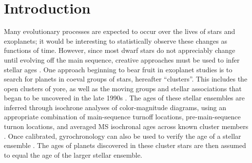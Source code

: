 \documentclass[12pt,twocolumn,tighten]{aastex62}
\begin{document}







\section{Introduction}
\label{sec:intro}

Many evolutionary processes are expected to occur over the lives of
stars and exoplanets; it would be interesting to statistically observe
these changes as functions of time.  However, since most dwarf stars
do not appreciably change until evolving off the
main sequence, creative approaches must be used to infer stellar ages
\citep{soderblom_ages_2010}.  One approach beginning to bear fruit in
exoplanet studies is to search for planets in coeval groups of stars,
hereafter ``clusters''.  This includes the open clusters of yore, as
well as the moving groups and stellar associations that began to be
uncovered in the late 1990s \citep{zuckerman_young_2004}.  The ages of
these stellar ensembles are inferred through isochrone analyses of
color-magnitude diagrams, using an appropriate combination of
main-sequence turnoff locations, pre-main-sequence turnon locations,
and averaged MS isochronal ages across known cluster members
\citep[{\it e.g.},][Section 3.4.3]{kharchenko_global_2012}.  Once
calibrated, gyrochronology can also be used to verify the age of a
stellar ensemble \citep[{\it
e.g.},][]{barnes_color-period_2015,meibom_spin-down_2015,curtis_tess_2019}.
The ages of planets discovered in these cluster stars are then assumed
to equal the age of the larger stellar ensemble.
\end{document}
